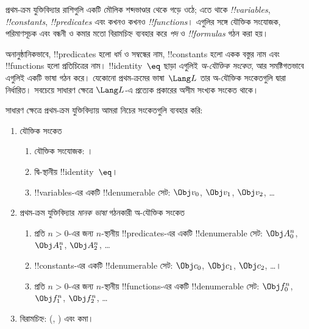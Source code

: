 \documentclass[../../../include/open-logic-section]{subfiles}
\begin{document}



প্রথম-ক্রম যুক্তিবিদ্যার রাশিগুলি একটি মৌলিক শব্দভাণ্ডার থেকে গড়ে ওঠে;
এতে থাকে \emph{!!{variable}s}, \emph{!!{constant}s},
\emph{!!{predicate}s} এবং কখনও কখনও \emph{!!{function}s}। এগুলির
সঙ্গে যৌক্তিক সংযোজক, পরিমাণসূচক এবং বন্ধনী ও কমার মতো বিরামচিহ্ন
ব্যবহার করে \emph{পদ} ও \emph{!!{formula}s} গঠন করা হয়।

\begin{explain}
অনানুষ্ঠানিকভাবে, !!{predicate}s হলো ধর্ম ও সম্বন্ধের নাম,
!!{constant}s হলো একক বস্তুর নাম এবং !!{function}s হলো প্রতিচিত্রের
নাম। !!{identity}~$\eq$ ছাড়া এগুলিই \emph{অ-যৌক্তিক সংকেত}, আর
সমষ্টিগতভাবে এগুলিই একটি ভাষা গঠন করে। যেকোনো প্রথম-ক্রমের ভাষা~$\Lang
L$ তার অ-যৌক্তিক সংকেতগুলি দ্বারা নির্ধারিত। সবচেয়ে সাধারণ ক্ষেত্রে
$\Lang L$-এ প্রত্যেক প্রকারের অসীম সংখ্যক সংকেত থাকে।
\end{explain}

সাধারণ ক্ষেত্রে প্রথম-ক্রম যুক্তিবিদ্যায় আমরা নিচের সংকেতগুলি ব্যবহার
করি:

\begin{enumerate}
\item যৌক্তিক সংকেত
\begin{enumerate}
\item যৌক্তিক সংযোজক:
  \startycommalist
  ।
\item দ্বি-স্থানীয় !!{identity}~$\eq$।
\item !!{variable}s-এর একটি !!{denumerable} সেট: $\Obj v_0$, $\Obj v_1$, $\Obj
  v_2$, \dots
\end{enumerate}
\item প্রথম-ক্রম যুক্তিবিদ্যার \emph{মানক ভাষা} গঠনকারী অ-যৌক্তিক
  সংকেত
\begin{enumerate}
\item প্রতি $n>0$-এর জন্য $n$-স্থানীয় !!{predicate}s-এর একটি
  !!{denumerable} সেট: $\Obj A^n_0$, $\Obj A^n_1$, $\Obj A^n_2$, \dots
\item !!{constant}s-এর একটি !!{denumerable} সেট: $\Obj c_0$, $\Obj c_1$, $\Obj
  c_2$, \dots।
\item প্রতি $n>0$-এর জন্য $n$-স্থানীয় !!{function}s-এর একটি
  !!{denumerable} সেট:
  $\Obj f^n_0$, $\Obj f^n_1$, $\Obj f^n_2$, \dots
\end{enumerate}
\item বিরামচিহ্ন: (, ) এবং কমা।
\end{enumerate}
\end{document}

